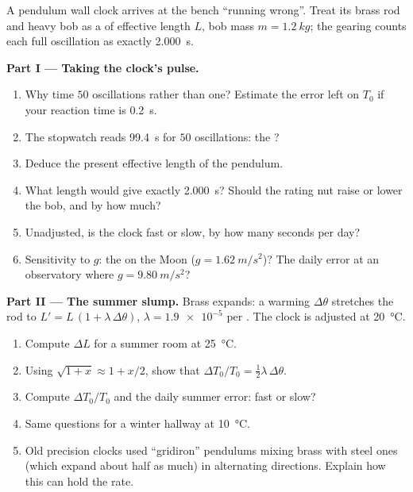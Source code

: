 \begin{problem}
\label{pb:g12:oscillators-and-time:1}
A pendulum wall clock arrives at the bench ``running wrong''. Treat
its brass rod and heavy bob as a  of effective length
$L$, bob mass $m = \qty{1.2}{kg}$; the gearing counts each full
oscillation as exactly \qty{2.000}{s}.

\medskip
\noindent\textbf{Part I --- Taking the clock's pulse.}
\begin{enumerate}
  \item Why time $50$ oscillations rather than one? Estimate the error
        left on $T_0$ if your reaction time is \qty{0.2}{s}.
  \item The stopwatch reads \qty{99.4}{s} for $50$ oscillations: the ?
  \item Deduce the present effective length of the pendulum.
  \item What length would give exactly \qty{2.000}{s}? Should the
        rating nut raise or lower the bob, and by how much?
  \item Unadjusted, is the clock fast or slow, by how many seconds per day?
  \item Sensitivity to $g$: the  on the Moon
        ($g = \qty{1.62}{m/s^2}$)? The daily error at an observatory
        where $g = \qty{9.80}{m/s^2}$?
\end{enumerate}

\medskip
\noindent\textbf{Part II --- The summer slump.} Brass expands: a
warming $\Delta\theta$ stretches the rod to $L' = L\,(1 + \lambda\,
\Delta\theta)$, $\lambda = \num{1.9e-5}$ per . The clock is
adjusted at \qty{20}{\celsius}.
\begin{enumerate}[resume]
  \item Compute $\Delta L$ for a summer room at \qty{25}{\celsius}.
  \item Using $\sqrt{1+x} \approx 1 + x/2$, show that
        $\Delta T_0 / T_0 = \tfrac12 \lambda\, \Delta\theta$.
  \item Compute $\Delta T_0/T_0$ and the daily summer error: fast or slow?
  \item Same questions for a winter hallway at \qty{10}{\celsius}.
  \item Old precision clocks used ``gridiron'' pendulums mixing brass
         with steel ones (which expand about half as much) in
        alternating directions. Explain how this can hold the rate.
\end{enumerate}


\end{problem}
